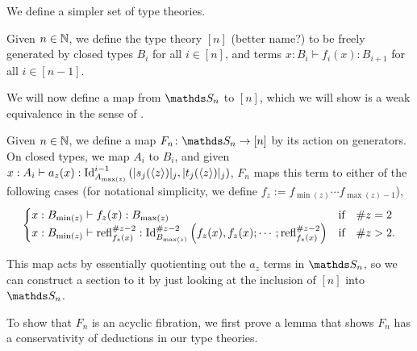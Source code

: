 \documentclass{article}
\begin{document}
We define a simpler set of type theories.

\begin{defn}
    Given $n\in\mathbb{N}$, we define the type theory $[n]$ (better name?) to be freely generated by closed types $B_i$ for all $i\in[n]$, and terms $x:B_i\vdash f_i(x):B_{i+1}$ for all $i\in[n-1]$.
\end{defn}

We will now define a map from $\bS_n$ to $[n]$, which we will show is a weak equivalence in the sense of \cite[Def. 3.1]{KL}.

\begin{defn}
    Given $n\in\mathbb{N}$, we define a map $F_n\colon\bS_n\to[n]$ by its action on generators. On closed types, we map $A_i$ to $B_i$, and given $x:A_i\vdash a_z(x):\operatorname{Id}_{A_{\max(z)}}^{i-1}\left(|s_j(\langle z\rangle)|_j,|t_j(\langle z\rangle)|_j\right)$, $F_n$ maps this term to either of the following cases (for notational simplicity, we define $f_z:=f_{\min(z)}\cdots f_{\max(z)-1}$),
    \[\begin{cases}
        x:B_{\min(z)}\vdash f_z(x):B_{\max(z)} & \text{if}\quad\#z=2\\
        x:B_{\min(z)}\vdash\operatorname{refl}^{\#z-2}_{f_z(x)}:\operatorname{Id}_{B_{\max(z)}}^{\#z-2}\left(f_z(x),f_z(x);\cdots;\operatorname{refl}^{\#z-2}_{f_z(x)}\right) & \text{if}\quad\#z>2.
    \end{cases}\]
\end{defn}

This map acts by essentially quotienting out the $a_z$ terms in $\bS_n$, so we can construct a section to it by just looking at the inclusion of $[n]$ into $\bS_n$.



To show that $F_n$ is an acyclic fibration, we first prove a lemma that shows $F_n$ has a conservativity of deductions in our type theories.
\end{document}
